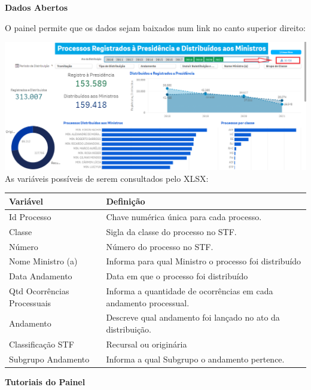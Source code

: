 \documentclass[
]{book}
\begin{document}
\textbf{Dados Abertos}

O painel permite que os dados sejam baixados num link no canto superior direito:

\includegraphics[width=1\linewidth]{imagens/fig-cap6-2}
As variáveis possíveis de serem consultados pelo XLSX:

\begin{tabular}{l|l}
\hline
Variável & Definição\\
\hline
Id Processo & Chave numérica única para cada processo.\\
\hline
Classe & Sigla da classe do processo no STF.\\
\hline
Número & Número do processo no STF.\\
\hline
Nome Ministro (a) & Informa para qual Ministro o processo foi distribuído\\
\hline
Data Andamento & Data em que o processo foi distribuído\\
\hline
Qtd Ocorrências Processuais & Informa a quantidade de ocorrências em cada andamento processual.\\
\hline
Andamento & Descreve qual andamento foi lançado no ato da distribuição.\\
\hline
Classificação STF & Recursal ou originária\\
\hline
Subgrupo Andamento & Informa a qual Subgrupo o andamento pertence.\\
\hline
\end{tabular}

\textbf{Tutoriais do Painel}
\end{document}
